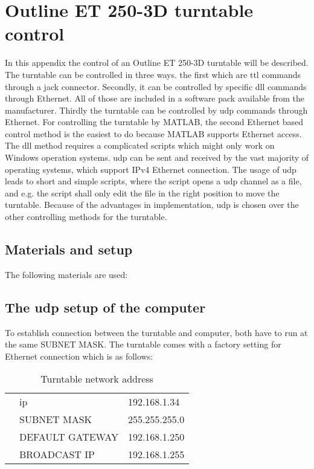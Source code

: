 \chapter{Outline ET 250-3D turntable control}\label{appendix:turntable}
In this appendix the control of an Outline ET 250-3D turntable will be described. The turntable can be controlled in three ways. the first which are  \gls{ttl} commands through a jack connector. Secondly, it  can be controlled by specific \gls{dll} commands through Ethernet. All of those are included in a software pack available from the manufacturer. Thirdly the turntable can be controlled by \gls{udp} commands through Ethernet. For controlling the turntable by MATLAB, the second Ethernet based control method is the easiest to do because MATLAB supports Ethernet access. The \gls{dll} method requires a complicated scripts which might only work on Windows operation systems. \gls{udp} can be sent and received by the vast majority of  operating systems, which support IPv4 Ethernet connection. The usage of \gls{udp} leads to short and simple scripts, where the script opens a \gls{udp} channel as a file, and e.g. the script shall only edit the file in the right position to move the turntable. Because of the advantages in implementation, \gls{udp} is chosen over the other controlling methods for the turntable.

\section*{Materials and setup}
The following materials are used:
\startequipment
{}
\stopequipment

\section*{The \gls{udp} setup of the computer}
To establish connection between the turntable and computer, both have to run at the same SUBNET MASK. The turntable comes with a factory setting for Ethernet connection which is as follows:

\begin{table}[H]
\centering
\caption{Turntable network address}
\label{udp_setup_for_computer}
\begin{tabular}{lll}
 & \gls{ip} & 192.168.1.34   \\
 & SUBNET MASK  & 255.255.255.0   \\
 & DEFAULT GATEWAY  & 192.168.1.250  \\
 & BROADCAST IP   &  192.168.1.255   
\end{tabular}
\end{table}



